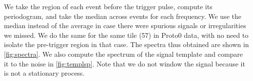 We take the region of each event before the trigger pulse, compute its
periodogram, and take the median across events for each frequency. We use the
median instead of the average in case there were spurious signals or
irregularities we missed. We do the same for the same tile (57) in Proto0 data,
with no need to isolate the pre-trigger region in that case. The spectra thus
obtained are shown in \autoref{fig:spectra}. We also compute the spectrum of
the signal template and compare it to the noise in \autoref{fig:templsp}. Note
that we do not window the signal because it is not a stationary process.

\begin{figure}[t]
    
    

\end{figure}

\begin{figure}[b]
    
    

\end{figure}

